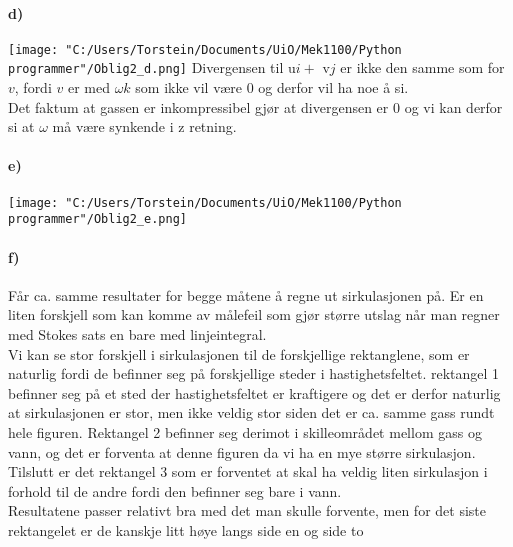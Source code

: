 \documentclass[11pt, A4paper,norsk]{article}
\begin{document}
		\paragraph{d)}
			\begin{flushleft}

\texttt{[image: "C:/Users/Torstein/Documents/UiO/Mek1100/Python programmer"/Oblig2\_d.png]}
Divergensen til u$i +$ v$j$ er ikke den samme som for $v$, fordi $v$ er med $\omega k$ som ikke vil være $0$ og derfor vil ha noe å si. \\
Det faktum at gassen er inkompressibel gjør at divergensen er $0$ og vi kan derfor si at $\omega$ må være synkende i z retning.
			\end{flushleft}










		\paragraph{e)}
			\begin{flushleft}

\texttt{[image: "C:/Users/Torstein/Documents/UiO/Mek1100/Python programmer"/Oblig2\_e.png]}
			\end{flushleft}









		\paragraph{f)}
			\begin{flushleft}

Får ca. samme resultater for begge måtene å regne ut sirkulasjonen på. Er en liten forskjell som kan komme av målefeil som gjør større utslag når man regner med Stokes sats en bare med linjeintegral. \\
Vi kan se stor forskjell i sirkulasjonen til de forskjellige rektanglene, som er naturlig fordi de befinner seg på forskjellige steder i hastighetsfeltet. rektangel 1 befinner seg på et sted der hastighetsfeltet er kraftigere og det er derfor naturlig at sirkulasjonen er stor, men ikke veldig stor siden det er ca. samme gass rundt hele figuren. Rektangel 2 befinner seg derimot i skilleområdet mellom gass og vann, og det er forventa at denne figuren da vi ha en mye større sirkulasjon. Tilslutt er det rektangel 3 som er forventet at skal ha veldig liten sirkulasjon i forhold til de andre fordi den befinner seg bare i vann. \\
Resultatene passer relativt bra med det man skulle forvente, men for det siste rektangelet er de kanskje litt høye langs side en og side to
			\end{flushleft}
\end{document}
